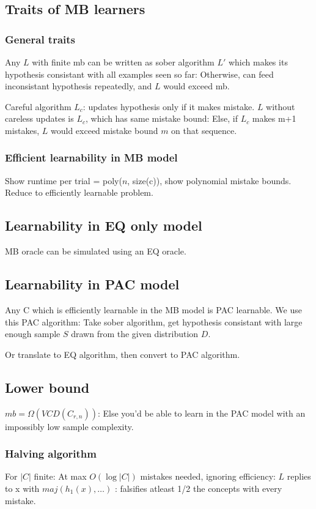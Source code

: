 \documentclass[oneside, article]{memoir}
\begin{document}
\subsection{Traits of MB learners}
\subsubsection{General traits}
Any $L$ with finite mb can be written as sober algorithm $L'$  which makes its hypothesis consistant with all examples seen so far: Otherwise, can feed inconsistant hypothesis repeatedly, and $L$ would exceed mb.

Careful algorithm $L_{c}$: updates hypothesis only if it makes mistake. $L$ without careless updates is $L_{c}$, which has same mistake bound: Else, if $L_{c}$ makes m+1 mistakes, $L$ would exceed mistake bound $m$ on that sequence.

\subsubsection{Efficient learnability in MB model}
Show runtime per trial = poly($n$, size(c)), show polynomial mistake bounds. Reduce to efficiently learnable problem.

\subsection{Learnability in EQ only model}
MB oracle can be simulated using an EQ oracle.

\subsection{Learnability in PAC model}
Any C which is efficiently learnable in the MB model is PAC learnable. We use this PAC algorithm: Take sober algorithm, get hypothesis consistant with large enough sample $S$ drawn from the given distribution $D$.

Or translate to EQ algorithm, then convert to PAC algorithm.

\subsection{Lower bound}
$mb = \Omega(VCD(C_{r,n}))$: Else you'd be able to learn in the PAC model with an impossibly low sample complexity.

\subsubsection{Halving algorithm}
For $|C|$ finite: At max $O(\log |C|)$ mistakes needed, ignoring efficiency: $L$ replies to x with $maj(h_{1}(x), \dots)$ : falsifies atleast 1/2 the concepts with every mistake.
\end{document}
